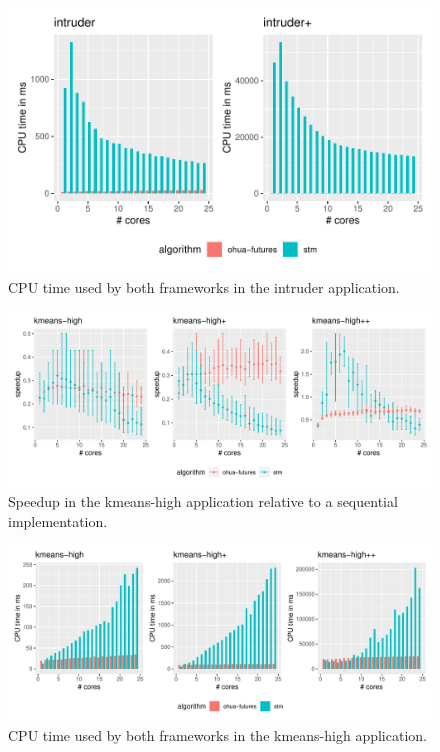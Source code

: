 \begin{figure}
    \centering
    \includegraphics[width=.66\textwidth,keepaspectratio]{gfx/results/cpu_intruder_comb}
    \caption{CPU time used by both frameworks in the intruder application.}%
    \label{fig:evaluation:intruder-cpu}
\end{figure}

\begin{figure}
    \centering
    \includegraphics[width=\textwidth,keepaspectratio]{gfx/results/kmeans-high_comb}
    \caption{Speedup in the kmeans-high application relative to a sequential implementation.}%
    \label{fig:evaluation:kmeans-high}
\end{figure}

\begin{figure}
    \centering
    \includegraphics[width=\textwidth,keepaspectratio]{gfx/results/cpu_kmeans-high_comb}
    \caption{CPU time used by both frameworks in the kmeans-high application.}%
    \label{fig:evaluation:kmeans-high-cpu}
\end{figure}

